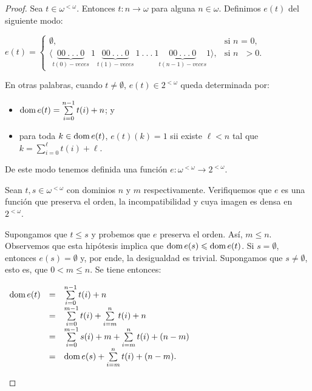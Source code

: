 \documentclass[11pt]{unam_tesis1}
\theoremstyle{MyThmStyle}
\theoremstyle{definition}
\theoremstyle{plain}
\theoremstyle{remark}
\def\dom{\mathop{\rm dom}\nolimits}
\let\leq\leqslant
\begin{document}
\begin{proof}
Sea $t\in \omega^{<\omega}$. Entonces $t:n \rightarrow \omega$ para alguna $n\in \omega$. Definimos $e(t)$ del siguiente modo:

\begin{center}
$e(t) = \begin{cases} \emptyset, & \mbox{si } n\mbox{ = $0$}, \\ \langle \underset {t(0)-veces}{\underbrace{00\ .\ .\ .\ 0}}\ 1\ \underset{ t(1)-veces}{\underbrace{00\ .\ .\ .\ 0}}\ 1\ .\ .\ .\ 1 \underset{ t(n-1)-veces}{\underbrace{00\ .\ .\ .\ 0}}1 \rangle, & \mbox{si } n\mbox{ $>0$}. \end{cases}$
\end{center}

En otras palabras, cuando $t\neq\emptyset$, $e(t) \in 2^{<\omega}$ queda determinada por:

\begin{itemize}

\item $\dom e(t)=\sum\limits_{i=0}^{n-1}t(i)+n$; y
\item para toda $k\in \dom e(t)$, $e(t)(k)=1$ sii existe $\ell<n$ tal que $k=\sum\limits_{i=0}^{\ell}t(i)+\ell$.

\end{itemize}

De este modo tenemos definida una funci\'on $e:\omega^{<\omega} \to 2^{<\omega}$.


Sean $t,s\in \omega^{<\omega}$ con dominios $n$ y $m$ respectivamente. Verifiquemos que $e$ es una funci\'on que preserva el orden, la incompatibilidad y cuya imagen es densa en $2^{<\omega}$.

Supongamos que $t\leq s$ y probemos que $e$ preserva el orden. As\'i, $m\leq n$. Observemos que esta hip\'otesis implica que $\dom e(s)\leq \dom e(t)$. Si $s=\emptyset$, entonces $e(s)=\emptyset$ y, por ende, la desigualdad es trivial. Supongamos que $s\neq \emptyset$, esto es, que $0<m\leq n$. Se tiene entonces:

\begin{center}
$\begin{array} {lcl} \dom e(t) &=& \sum\limits_{i=0}^{n-1}t(i)+n\\ &=& \sum\limits_{i=0}^{m-1}t(i)+\sum\limits_{i=m}^{n}t(i)+n\\ &=& \sum\limits_{i=0}^{m-1}s(i)+m+\sum\limits_{i=m}^{n}t(i)+(n-m) \\ &=& \dom e(s)+ \sum\limits_{i=m}^{n}t(i)+(n-m).\end{array}$
\end{center}


\end{proof}
\end{document}
